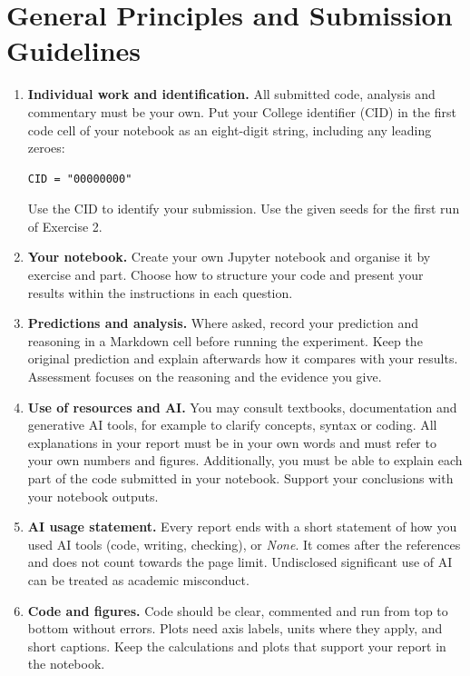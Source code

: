 \documentclass[10pt]{article}
\begin{document}

\section*{General Principles and Submission Guidelines}
\begin{enumerate}
\item \textbf{Individual work and identification.} All submitted code, analysis and commentary must be your own. Put your College identifier (CID) in the first code cell of your notebook as an eight-digit string, including any leading zeroes:
\begin{lstlisting}
CID = "00000000"
\end{lstlisting}
Use the CID to identify your submission. Use the given seeds for the first run of Exercise 2.

\item \textbf{Your notebook.} Create your own Jupyter notebook and organise it by exercise and part. Choose how to structure your code and present your results within the instructions in each question.

\item \textbf{Predictions and analysis.} Where asked, record your prediction and reasoning in a Markdown cell before running the experiment. Keep the original prediction and explain afterwards how it compares with your results. Assessment focuses on the reasoning and the evidence you give.

\item \textbf{Use of resources and AI.} You may consult textbooks, documentation and generative AI tools, for example to clarify concepts, syntax or coding. All explanations in your report must be in your own words and must refer to your own numbers and figures. Additionally, you must be able to explain each part of the code submitted in your notebook. Support your conclusions with your notebook outputs.

\item \textbf{AI usage statement.} Every report ends with a short statement of how you used AI tools (code, writing, checking), or \emph{None}. It comes after the references and does not count towards the page limit. Undisclosed significant use of AI can be treated as academic misconduct.

\item \textbf{Code and figures.} Code should be clear, commented and run from top to bottom without errors. Plots need axis labels, units where they apply, and short captions. Keep the calculations and plots that support your report in the notebook.


\end{enumerate}
\end{document}
